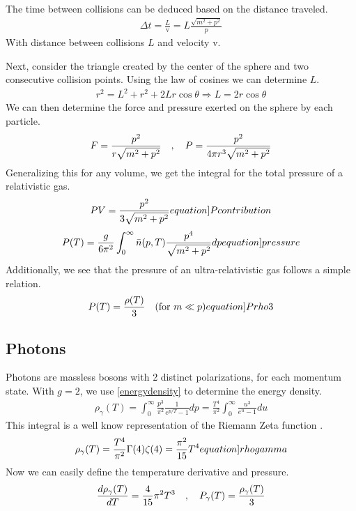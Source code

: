 The time between collisions can be deduced based on the distance traveled. 
\begin{align}
    \Delta t = \frac{L}{\mathrm{v}}=L\frac{\sqrt{m^2+p^2}}{p}
\end{align}
With distance between collisions $L$ and velocity $\mathrm{v}$.

Next, consider the triangle created by the center of the sphere and two consecutive collision points. Using the law of cosines we can determine $L$.
\begin{align}
    r^2=L^2+r^2+2L r \cos \theta \Rightarrow
    L = 2r \cos \theta
\end{align}
We can then determine the force and pressure exerted on the sphere by each particle. 
\begin{align}
    F = \frac{p^2}{r\sqrt{m^2+p^2}} \quad , \quad P = \frac{p^2}{4\pi r^3\sqrt{m^2+p^2}}
\end{align}
Generalizing this for any volume, we get the integral for the total pressure of a relativistic gas.
\begin{align}
    PV=\frac{p^2}{3\sqrt{m^2+p^2}} 
    \label[equation]{Pcontribution}
\end{align}
\begin{align}
    P(T)=\frac{g}{6\pi^2}\int_{0}^{\infty}\bar{n}(p,T)\frac{p^4}{\sqrt{m^2+p^2}}dp
    \label[equation]{pressure}
\end{align}
Additionally, we see that the pressure of an ultra-relativistic gas follows a simple relation.
\begin{align}
    P(T)=\frac{\rho(T)}{3} \quad (\text{for } m\ll p)
    \label[equation]{Prho3}
\end{align}

\subsection{Photons}


Photons are massless bosons with 2 distinct polarizations, for each momentum state. With $g=2$, we use \ref{energydensity} to determine the energy density. 
\begin{align}
    \rho_\gamma(T)=\int_{0}^{\infty} \frac{p^3}{\pi^2}\frac{1}{e^{p/T}-1}dp =  \frac{T^4}{\pi^2}\int_{0}^{\infty}\frac{u^3}{e^{u}-1}du
\end{align}
This integral is a well know representation of the Riemann Zeta function \cite[\href{https://dlmf.nist.gov/25.5.E1}{(25.5.1)}]{NIST:DLMF}.
\begin{align}
    \rho_\gamma(T)=\frac{T^4}{\pi^2}\Gamma(4)\zeta(4)=\frac{\pi^2}{15}T^4
    \label[equation]{rhogamma}
\end{align}
Now we can easily define the temperature derivative and pressure.
\begin{align}
    \frac{d\rho_\gamma(T)}{dT}=\frac{4}{15}\pi^2T^3 \quad , \quad P_\gamma(T)=\frac{\rho_\gamma(T)}{3}
\end{align}




